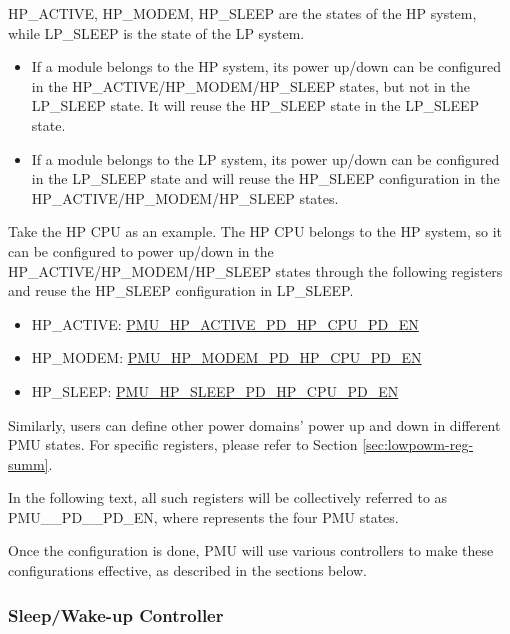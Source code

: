 \documentclass[main\_\_EN.tex]{subfiles}
\begin{document}
HP\_ACTIVE, HP\_MODEM, HP\_SLEEP are the states of the HP system, while LP\_SLEEP is the state of the LP system.

\begin{itemize}
    \item If a module belongs to the HP system, its power up/down can be configured in the HP\_ACTIVE/HP\_MODEM/HP\_SLEEP states, but not in the LP\_SLEEP state. It will reuse the HP\_SLEEP state in the LP\_SLEEP state.
    \item If a module belongs to the LP system, its power up/down can be configured in the LP\_SLEEP state and will reuse the HP\_SLEEP configuration in the HP\_ACTIVE/HP\_MODEM/HP\_SLEEP states.
\end{itemize}

Take the HP CPU as an example. The HP CPU belongs to the HP system, so it can be configured to power up/down in the HP\_ACTIVE/HP\_MODEM/HP\_SLEEP states through the following registers and reuse the HP\_SLEEP configuration in LP\_SLEEP.

\begin{itemize}
    \item HP\_ACTIVE: \hyperref[fielddesc:PMUHPACTIVEPDHPCPUPDEN]{PMU\_HP\_ACTIVE\_PD\_HP\_CPU\_PD\_EN}
    \item HP\_MODEM: \hyperref[fielddesc:PMUHPMODEMPDHPCPUPDEN]{PMU\_HP\_MODEM\_PD\_HP\_CPU\_PD\_EN}
    \item HP\_SLEEP: \hyperref[fielddesc:PMUHPSLEEPPDHPCPUPDEN]{PMU\_HP\_SLEEP\_PD\_HP\_CPU\_PD\_EN}
\end{itemize}

Similarly, users can define other power domains' power up and down in different PMU states. For specific registers, please refer to Section \ref{sec:lowpowm-reg-summ}.

\begin{tiplisting}
In the following text, all such registers will be collectively referred to as PMU\_\_PD\_\_PD\_EN, where  represents the four PMU states.
\end{tiplisting}

Once the configuration is done, PMU will use various controllers to make these configurations effective, as described in the sections below.

\subsubsection{Sleep/Wake-up Controller}
\end{document}
